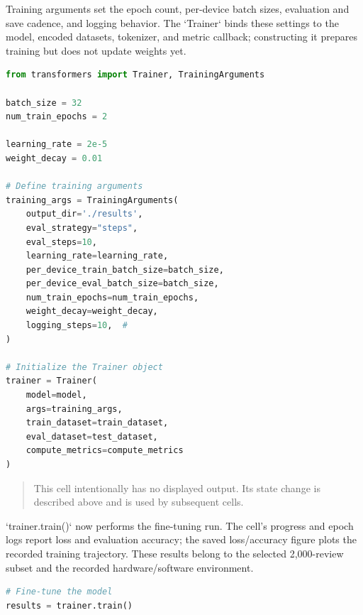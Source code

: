 \documentclass[../labs.tex]{subfiles}
\begin{document}
Training arguments set the epoch count, per-device batch sizes, evaluation and save cadence, and logging behavior. The `Trainer` binds these settings to the model, encoded datasets, tokenizer, and metric callback; constructing it prepares training but does not update weights yet.


\begin{lstlisting}[language=Python,basicstyle=\ttfamily\scriptsize,breaklines=true,breakatwhitespace=false,columns=fullflexible,keepspaces=true,numbers=none]
from transformers import Trainer, TrainingArguments

batch_size = 32
num_train_epochs = 2

learning_rate = 2e-5
weight_decay = 0.01

# Define training arguments
training_args = TrainingArguments(
    output_dir='./results',
    eval_strategy="steps",
    eval_steps=10,
    learning_rate=learning_rate,
    per_device_train_batch_size=batch_size,
    per_device_eval_batch_size=batch_size,
    num_train_epochs=num_train_epochs,
    weight_decay=weight_decay,
    logging_steps=10,  # 
)

# Initialize the Trainer object
trainer = Trainer(
    model=model,
    args=training_args,
    train_dataset=train_dataset,
    eval_dataset=test_dataset,
    compute_metrics=compute_metrics
)
\end{lstlisting}

\hypertarget{out:lab03-bert-c32}{}\label{out:lab03-bert-c32}

\begin{quote}\small This cell intentionally has no displayed output. Its state change is described above and is used by subsequent cells.\end{quote}


`trainer.train()` now performs the fine-tuning run. The cell’s progress and epoch logs report loss and evaluation accuracy; the saved loss/accuracy figure plots the recorded training trajectory. These results belong to the selected 2,000-review subset and the recorded hardware/software environment.


\begin{lstlisting}[language=Python,basicstyle=\ttfamily\scriptsize,breaklines=true,breakatwhitespace=false,columns=fullflexible,keepspaces=true,numbers=none]
# Fine-tune the model
results = trainer.train()
\end{lstlisting}
\end{document}

